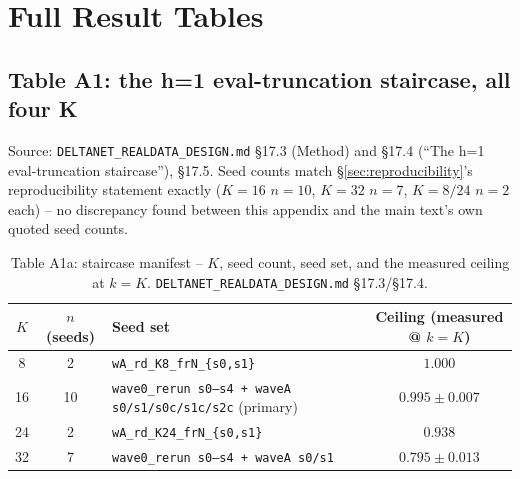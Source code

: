 \section{Full Result Tables}
\label{sec:appendix-tables}

%

\subsection{Table A1: the h=1 eval-truncation staircase, all four K}
\label{tab:a1-eval-truncation}

Source: \texttt{DELTANET\_REALDATA\_DESIGN.md} \S17.3 (Method) and \S17.4
(``The h=1 eval-truncation staircase''), \S17.5. Seed counts match
\S\ref{sec:reproducibility}'s reproducibility statement exactly
($K{=}16$ $n{=}10$, $K{=}32$ $n{=}7$, $K{=}8/24$ $n{=}2$ each) --
no discrepancy found between this appendix and the main text's own
quoted seed counts.

\begin{table}[htbp]
\centering
\small
\begin{tabular}{cclc}
\toprule
$K$ & $n$ (seeds) & Seed set & Ceiling (measured @ $k{=}K$) \\
\midrule
8  & 2  & \texttt{wA\_rd\_K8\_frN\_\{s0,s1\}} & $1.000$ \\
16 & 10 & \texttt{wave0\_rerun s0--s4 + waveA s0/s1/s0c/s1c/s2c} (primary) & $0.995 \pm 0.007$ \\
24 & 2  & \texttt{wA\_rd\_K24\_frN\_\{s0,s1\}} & $0.938$ \\
32 & 7  & \texttt{wave0\_rerun s0--s4 + waveA s0/s1} & $0.795 \pm 0.013$ \\
\bottomrule
\end{tabular}
\caption{Table A1a: staircase manifest -- $K$, seed count, seed set, and
the measured ceiling at $k{=}K$. \texttt{DELTANET\_REALDATA\_DESIGN.md}
\S17.3/\S17.4.}
\end{table}

